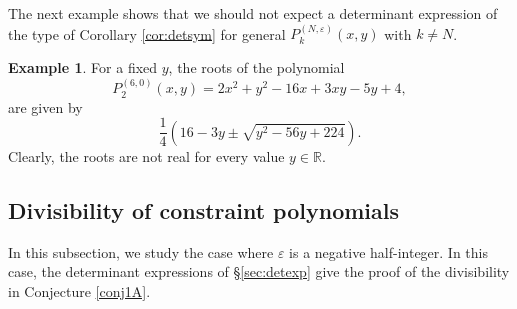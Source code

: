 \documentclass[11pt]{article}
\numberwithin{equation}{section}
\newcommand{\R}{\mathbb{R}} %
\newcommand{\e}{\varepsilon}
\newcommand{\cp}[2]{P^{(#1)}_{#2}} %
\theoremstyle{plain}
\theoremstyle{definition}
\newtheorem{ex}{Example}[section]
\theoremstyle{remark}
\begin{document}
The next example shows that we should not expect a determinant expression
of the type of Corollary \ref{cor:detsym} for general \(\cp{N,\e}{k}(x,y)\) with \(k \neq N\).

\begin{ex} \label{ex:nonrealroots}
  For a fixed \(y\), the roots of the polynomial
  \[
    \cp{6,0}{2}(x,y) = 2 x^2 +y^2 -16 x + 3 x y -5 y + 4,
  \]
  are given by
  \[
    \frac{1}{4} \left(16 -3 y  \pm \sqrt{y^2-56 y+224}\right).
  \]
  Clearly, the roots are not real for every value \(y \in \R\).
\end{ex}

\subsection{Divisibility of constraint polynomials} \label{sec:negeps}

In this subsection, we study the case where \(\e\) is a
negative half-integer. In this case, the determinant expressions
of \S \ref{sec:detexp} give the proof of the divisibility in Conjecture \ref{conj1A}.
\end{document}
